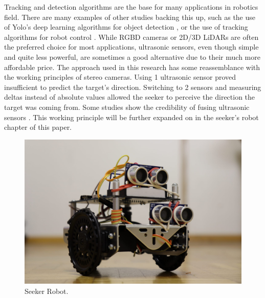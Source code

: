 \documentclass[sigconf,nonacm]{acmart}
\begin{document}
    Tracking and detection algorithms are the base for many
    applications in robotics field. There are many examples of other studies
    backing this up, such as the use of Yolo's deep learning algorithms for
    object detection \cite{r1}, or the use of tracking algorithms for robot
    control \cite{control_robot}. While RGBD cameras or 2D/3D LiDARs are often
    the preferred choice for most applications\cite{r2}, ultrasonic sensors, even though
    simple and quite less powerful, are sometimes a good alternative due to
    their much more affordable price\cite{Zhmud_2018}. The approach used in this research has
    some reassemblance with the working principles of stereo cameras\cite{panich2010comparison}. Using 1
    ultrasonic sensor proved insufficient to predict the target's direction.
    Switching to 2 sensors and measuring deltas instead of absolute values
    allowed the seeker to perceive the direction the target was coming from.
    Some studies show the credibility of fusing ultrasonic sensors \cite{ultrasonic_fusion}.
    This working principle will be further expanded on in the seeker's robot
    chapter of this paper.

\begin{figure}[h]
    \centering
    \includegraphics[scale=0.1]{resources/Seeker_robot/4.jpeg}
    \caption{\label{fig:Seeker}Seeker Robot.}
\end{figure}
\end{document}
